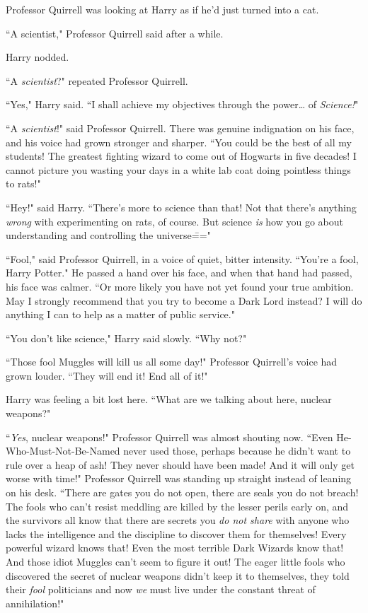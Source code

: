 Professor Quirrell was looking at Harry as if he'd just turned into a cat.

``A scientist," Professor Quirrell said after a while.

Harry nodded.

``A \emph{scientist}?" repeated Professor Quirrell.

``Yes," Harry said. ``I shall achieve my objectives through the power{\ldots} of \emph{Science!}"

``A \emph{scientist}!" said Professor Quirrell. There was genuine indignation on his face, and his voice had grown stronger and sharper. ``You could be the best of all my students! The greatest fighting wizard to come out of Hogwarts in five decades! I cannot picture you wasting your days in a white lab coat doing pointless things to rats!"

``Hey!" said Harry. ``There's more to science than that! Not that there's anything \emph{wrong} with experimenting on rats, of course. But science \emph{is} how you go about understanding and controlling the universe\==="

``Fool," said Professor Quirrell, in a voice of quiet, bitter intensity. ``You're a fool, Harry Potter." He passed a hand over his face, and when that hand had passed, his face was calmer. ``Or more likely you have not yet found your true ambition. May I strongly recommend that you try to become a Dark Lord instead? I will do anything I can to help as a matter of public service."

``You don't like science," Harry said slowly. ``Why not?"

``Those fool Muggles will kill us all some day!" Professor Quirrell's voice had grown louder. ``They will end it! End all of it!"

Harry was feeling a bit lost here. ``What are we talking about here, nuclear weapons?"

``\emph{Yes}, nuclear weapons!" Professor Quirrell was almost shouting now. ``Even He-Who-Must-Not-Be-Named never used those, perhaps because he didn't want to rule over a heap of ash! They never should have been made! And it will only get worse with time!" Professor Quirrell was standing up straight instead of leaning on his desk. ``There are gates you do not open, there are seals you do not breach! The fools who can't resist meddling are killed by the lesser perils early on, and the survivors all know that there are secrets you \emph{do not share} with anyone who lacks the intelligence and the discipline to discover them for themselves! Every powerful wizard knows that! Even the most terrible Dark Wizards know that! And those idiot Muggles can't seem to figure it out! The eager little fools who discovered the secret of nuclear weapons didn't keep it to themselves, they told their \emph{fool} politicians and now \emph{we} must live under the constant threat of annihilation!"

